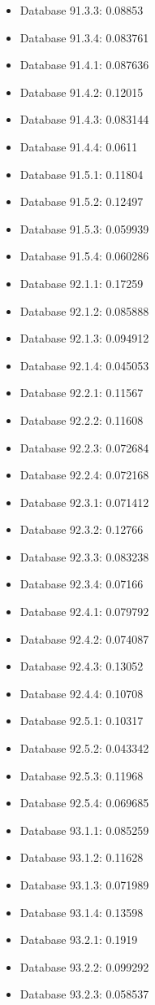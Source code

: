 \begin{itemize}
\item Database 91.3.3: 0.08853
\item Database 91.3.4: 0.083761
\item Database 91.4.1: 0.087636
\item Database 91.4.2: 0.12015
\item Database 91.4.3: 0.083144
\item Database 91.4.4: 0.0611
\item Database 91.5.1: 0.11804
\item Database 91.5.2: 0.12497
\item Database 91.5.3: 0.059939
\item Database 91.5.4: 0.060286
\item Database 92.1.1: 0.17259
\item Database 92.1.2: 0.085888
\item Database 92.1.3: 0.094912
\item Database 92.1.4: 0.045053
\item Database 92.2.1: 0.11567
\item Database 92.2.2: 0.11608
\item Database 92.2.3: 0.072684
\item Database 92.2.4: 0.072168
\item Database 92.3.1: 0.071412
\item Database 92.3.2: 0.12766
\item Database 92.3.3: 0.083238
\item Database 92.3.4: 0.07166
\item Database 92.4.1: 0.079792
\item Database 92.4.2: 0.074087
\item Database 92.4.3: 0.13052
\item Database 92.4.4: 0.10708
\item Database 92.5.1: 0.10317
\item Database 92.5.2: 0.043342
\item Database 92.5.3: 0.11968
\item Database 92.5.4: 0.069685
\item Database 93.1.1: 0.085259
\item Database 93.1.2: 0.11628
\item Database 93.1.3: 0.071989
\item Database 93.1.4: 0.13598
\item Database 93.2.1: 0.1919
\item Database 93.2.2: 0.099292
\item Database 93.2.3: 0.058537

\end{itemize}
